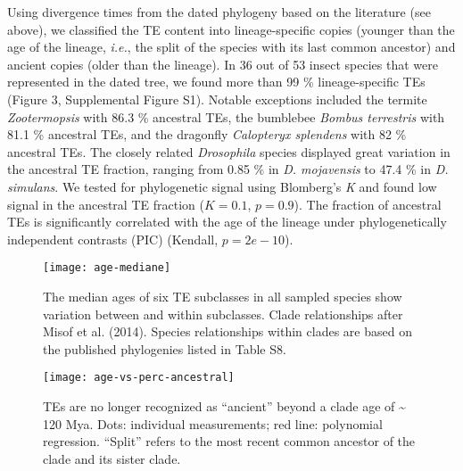 Using divergence times from the dated phylogeny based on the literature
(see above), we classified the TE content into lineage-specific copies
(younger than the age of the lineage, \emph{i.e.}, the split of the
species with its last common ancestor) and ancient copies (older than
the lineage). In 36 out of 53 insect species that were represented in
the dated tree, we found more than 99 \% lineage-specific TEs (Figure 3,
Supplemental Figure S1). Notable exceptions included the termite
\emph{Zootermopsis} with 86.3 \% ancestral TEs, the bumblebee
\emph{Bombus terrestris} with 81.1 \% ancestral TEs, and the dragonfly
\emph{Calopteryx splendens} with 82 \% ancestral TEs. The closely
related \emph{Drosophila} species displayed great variation in the
ancestral TE fraction, ranging from 0.85 \% in \emph{D. mojavensis} to
47.4 \% in \emph{D. simulans}. We tested for phylogenetic signal using
Blomberg's \emph{K} and found low signal in the ancestral TE fraction
(\(K = 0.1\), \(p = 0.9\)). The fraction of ancestral TEs
is significantly correlated with the age of the lineage under
phylogenetically independent contrasts (PIC) (Kendall,
\(p = 2e-10\)).

\begin{figure}[h!]
\begin{center}
\texttt{[image: age-mediane]}
\caption{{The median ages of six TE subclasses in all sampled species show
variation between and within subclasses. Clade relationships after Misof
et al. (2014). Species relationships within clades are based on the
published phylogenies listed in Table S8.
{\label{301428}}%
}}
\end{center}
\end{figure}

\begin{figure}[h!]
\begin{center}
\texttt{[image: age-vs-perc-ancestral]}
\caption{{TEs are no longer recognized as ``ancient'' beyond a clade age of
\textasciitilde{} 120 Mya. Dots: individual measurements; red line:
polynomial regression. ``Split'' refers to the most recent common
ancestor of the clade and its sister clade.
{\label{807049}}%
}}
\end{center}
\end{figure}

